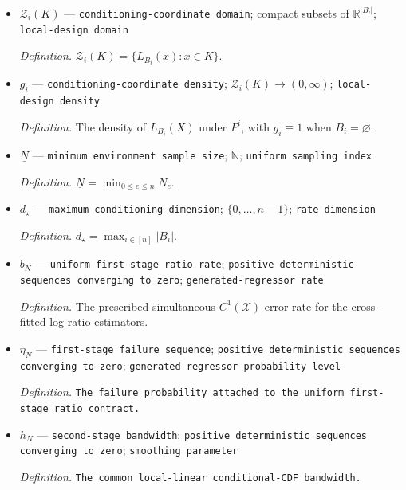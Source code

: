 \documentclass{article}
\begin{document}
\begin{itemize}
  \par\smallskip\noindent\emph{Definition.} \texttt{The fixed observed-\allowbreak{}space domain on which every ratio and recovered coordinate is evaluated uniformly.}
  \item \(\mathcal Z_i(K)\) --- \texttt{conditioning-\allowbreak{}coordinate domain}; compact subsets of \(\mathbb R^{|B_i|}\); \texttt{local-\allowbreak{}design domain}
  \par\smallskip\noindent\emph{Definition.} \(\mathcal Z_i(K)=\{L_{B_i}(x):x\in K\}\).
  \item \(g_i\) --- \texttt{conditioning-\allowbreak{}coordinate density}; \(\mathcal Z_i(K)\to(0,\infty)\); \texttt{local-\allowbreak{}design density}
  \par\smallskip\noindent\emph{Definition.} The density of \(L_{B_i}(X)\) under \(P^i\), with \(g_i\equiv1\) when \(B_i=\varnothing\).
  \item \(\underline N\) --- \texttt{minimum environment sample size}; \(\mathbb N\); \texttt{uniform sampling index}
  \par\smallskip\noindent\emph{Definition.} \(\underline N=\min_{0\le e\le n}N_e\).
  \item \(d_\star\) --- \texttt{maximum conditioning dimension}; \(\{0,\ldots,n-1\}\); \texttt{rate dimension}
  \par\smallskip\noindent\emph{Definition.} \(d_\star=\max_{i\in[n]}|B_i|\).
  \item \(b_N\) --- \texttt{uniform first-\allowbreak{}stage ratio rate}; \texttt{positive deterministic sequences converging to zero}; \texttt{generated-\allowbreak{}regressor rate}
  \par\smallskip\noindent\emph{Definition.} The prescribed simultaneous \(C^1(\mathcal X)\) error rate for the cross-fitted log-ratio estimators.
  \item \(\eta_N\) --- \texttt{first-\allowbreak{}stage failure sequence}; \texttt{positive deterministic sequences converging to zero}; \texttt{generated-\allowbreak{}regressor probability level}
  \par\smallskip\noindent\emph{Definition.} \texttt{The failure probability attached to the uniform first-\allowbreak{}stage ratio contract.}
  \item \(h_N\) --- \texttt{second-\allowbreak{}stage bandwidth}; \texttt{positive deterministic sequences converging to zero}; \texttt{smoothing parameter}
  \par\smallskip\noindent\emph{Definition.} \texttt{The common local-\allowbreak{}linear conditional-\allowbreak{}CDF bandwidth.}

\end{itemize}
\end{document}
